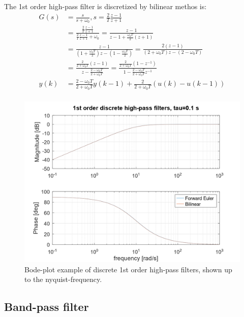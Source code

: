 \documentclass[]{book}
\begin{document}
The 1st order high-pass filter is discretized by bilinear methos is:
\[
\begin{aligned}
G(s) &=  \frac{s}{s + \omega_0}, s=\frac{2}{T} \frac{z-1}{z+1}  \\
&=  \frac{\frac{2}{T} \frac{z-1}{z+1}}{\frac{2}{T} \frac{z-1}{z+1} + \omega_0}
=\frac{z-1}{z-1 + \frac{\omega_0 T}{2}(z+1) } \\
&=\frac{z-1}{(1+\frac{\omega_0 T}{2}) z - (1-\frac{\omega_0 T}{2}) }
= \frac{2(z-1)}{(2+\omega_0 T) z - (2-\omega_0 T) }   \\
&= \frac{ \frac{2}{2+\omega_0 T} (z-1)}{ z - \frac{2-\omega_0 T}{2+\omega_0 T} }  
= \frac{ \frac{2}{2+\omega_0 T} (1-z^{-1})}{ 1 - \frac{2-\omega_0 T}{2+\omega_0 T}z^{-1} }  \\
y(k) &=   \frac{2-\omega_0 T}{2+\omega_0 T}y(k-1)   + \frac{2}{2+\omega_0 T}  (u(k)-u(k-1)) \\
\end{aligned}
\label{eq:dhpf2}
\]

\begin{figure}
\includegraphics[width=1\linewidth]{images/filters/hpf_1st_disc} \caption{Bode-plot example of discrete 1st order high-pass filters, shown up to the nyquist-frequency.}\label{fig:unnamed-chunk-9}
\end{figure}

\hypertarget{band-pass-filter-1}{%
\subsection{Band-pass filter}\label{band-pass-filter-1}}
\end{document}
